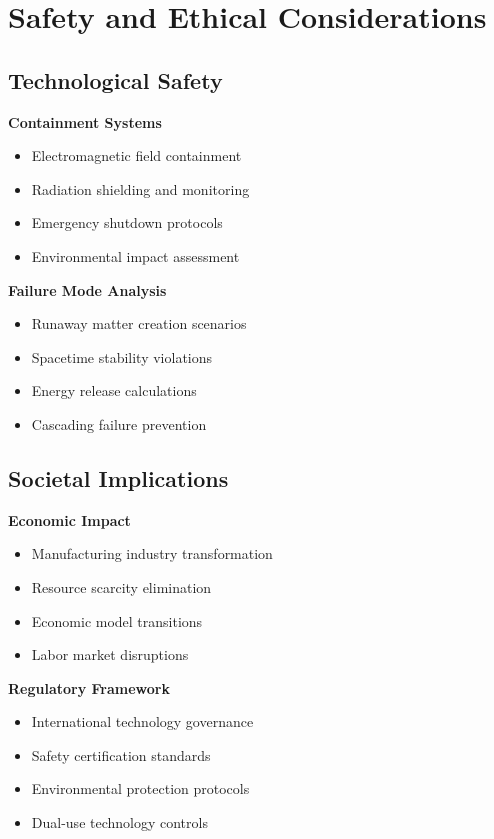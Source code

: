 \documentclass[11pt]{article}
\begin{document}
\section{Safety and Ethical Considerations}

\subsection{Technological Safety}

\textbf{Containment Systems}
\begin{itemize}
\item Electromagnetic field containment
\item Radiation shielding and monitoring
\item Emergency shutdown protocols
\item Environmental impact assessment
\end{itemize}

\textbf{Failure Mode Analysis}
\begin{itemize}
\item Runaway matter creation scenarios
\item Spacetime stability violations
\item Energy release calculations
\item Cascading failure prevention
\end{itemize}

\subsection{Societal Implications}

\textbf{Economic Impact}
\begin{itemize}
\item Manufacturing industry transformation
\item Resource scarcity elimination
\item Economic model transitions
\item Labor market disruptions
\end{itemize}

\textbf{Regulatory Framework}
\begin{itemize}
\item International technology governance
\item Safety certification standards
\item Environmental protection protocols
\item Dual-use technology controls
\end{itemize}
\end{document}
